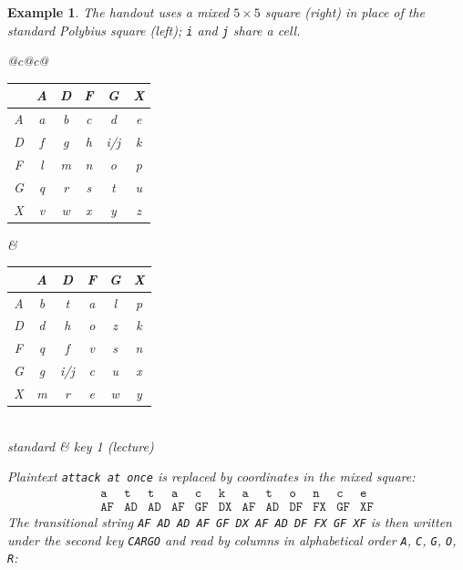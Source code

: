 \documentclass[11pt]{article}
\newtheorem{example}[theorem]{Example}
\theoremstyle{remark}
\begin{document}
\begin{example}
The handout uses a mixed $5\times 5$ square (right) in place of the
standard Polybius square (left); \texttt{i} and \texttt{j} share a cell.
\begin{center}
\renewcommand{\arraystretch}{1.15}
\begin{tabular}{@{}c@{\qquad}c@{}}
\begin{tabular}{|c||c|c|c|c|c|}
\hline
 & A & D & F & G & X \\
\hline\hline
A & a & b & c & d & e \\
\hline
D & f & g & h & i/j & k \\
\hline
F & l & m & n & o & p \\
\hline
G & q & r & s & t & u \\
\hline
X & v & w & x & y & z \\
\hline
\end{tabular}
&
\begin{tabular}{|c||c|c|c|c|c|}
\hline
 & A & D & F & G & X \\
\hline\hline
A & b & t & a & l & p \\
\hline
D & d & h & o & z & k \\
\hline
F & q & f & v & s & n \\
\hline
G & g & i/j & c & u & x \\
\hline
X & m & r & e & w & y \\
\hline
\end{tabular}\\[4pt]
\small standard & \small key 1 (lecture)
\end{tabular}
\end{center}
Plaintext \texttt{attack at once} is replaced by coordinates in the
mixed square:
\[
\begin{array}{cccccccccccc}
\texttt{a}&\texttt{t}&\texttt{t}&\texttt{a}&\texttt{c}&\texttt{k}&
\texttt{a}&\texttt{t}&\texttt{o}&\texttt{n}&\texttt{c}&\texttt{e}\\
\texttt{AF}&\texttt{AD}&\texttt{AD}&\texttt{AF}&\texttt{GF}&\texttt{DX}&
\texttt{AF}&\texttt{AD}&\texttt{DF}&\texttt{FX}&\texttt{GF}&\texttt{XF}
\end{array}
\]
The transitional string \texttt{AF AD AD AF GF DX AF AD DF FX GF XF} is
then written under the second key \texttt{CARGO} and read by columns in
alphabetical order \texttt{A}, \texttt{C}, \texttt{G}, \texttt{O},
\texttt{R}:
\begin{center}
\renewcommand{\arraystretch}{1.15}
\begin{tabular}{@{}c@{\qquad}c@{\qquad}c@{}}

\end{tabular}
\end{center}
\end{example}
\end{document}
